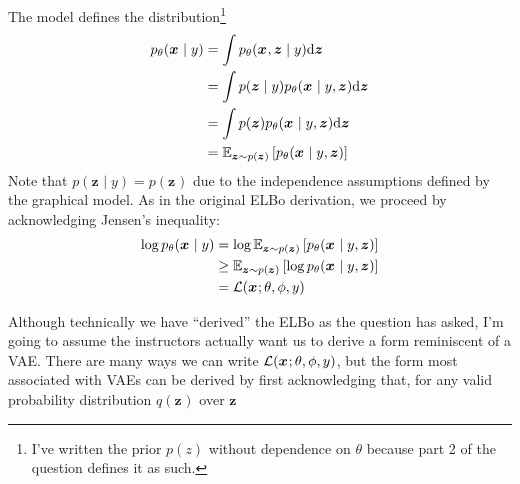 \documentclass[11pt]{article}
\renewcommand\vec[2][]{\bm{#2}_{#1}}
\newcommand\p{\noindent}
\begin{document}
\p The model defines the distribution\footnote{I've written the prior $p(z)$ without dependence on $\theta$ because part 2 of the question defines it as such.}
\begin{align}
	p_{\theta}(\vec x \mid y) 
		&= \int p_{\theta}  (\vec x, \vec z \mid y) \mathrm{d} \vec z \\
		&= \int p(\vec z \mid y) p_{\theta}(\vec x \mid y, \vec z) \mathrm{d} \vec z \\
		&= \int p(\vec z) p_{\theta}(\vec x \mid y, \vec z) \mathrm{d} \vec z \\
		&= \E[\vec z \sim p(\vec z)]{p_{\theta}(\vec x \mid y, \vec z)}
\end{align}
Note that $p(\vec z \mid y) = p(\vec z)$ due to the independence assumptions defined by the graphical model. As in the original ELBo derivation, we proceed by acknowledging Jensen's inequality:
\begin{align}
	\log p_{\theta}(\vec x \mid y)
		&= \log \E[\vec z \sim p(\vec z)]{p_{\theta}(\vec x \mid y, \vec z)} \\
		&\ge \E[\vec z \sim p(\vec z)]{\log p_{\theta}(\vec x \mid y, \vec z)} \\
		&= \elbo 
\end{align}

\p Although technically we have ``derived'' the ELBo as the question has asked, I'm going to assume the instructors actually want us to derive a form reminiscent of a VAE. There are many ways we can write $\elbo$, but the form most associated with VAEs can be derived by first acknowledging that, for any valid probability distribution $q(\vec z)$ over $\vec z$

\newcommand\pt{p_{\theta}}
\newcommand\pcond{p_{\theta}(\vec x \mid y)}
\newcommand\dz{\mathrm{d}\vec z}
\end{document}
